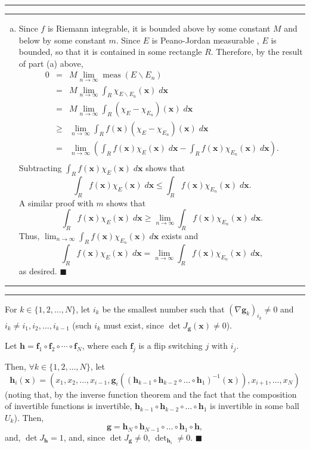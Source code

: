 \documentclass[11pt]{article}
\newcounter{questionCounter}
\newcounter{partCounter}[questionCounter]
\newenvironment{question}[2][\arabic{questionCounter}]{%
    \setcounter{partCounter}{0}%
    \vspace{.25in} \hrule \vspace{0.5em}%
        \noindent{\bf #2}%
    \vspace{0.8em} \hrule \vspace{.10in}%
    \addtocounter{questionCounter}{1}%
}{}
\renewcommand{\qed}{\quad $\blacksquare$}
\newcommand{\meas}{\operatorname{meas}}
\newcommand{\bx}{\mathbf{x}}
\newcommand{\bff}{\mathbf{f}}
\newcommand{\bfg}{\mathbf{g}}
\newcommand{\bfh}{\mathbf{h}}
\newcommand{\pjm}{Peano-Jordan measurable }
\begin{document}
\begin{question}{Problem 2}
\begin{enumerate}[(a)]
\item
Since $f$ is Riemann integrable, it is bounded above by some constant $M$ and
below by some constant $m$.
Since $E$ is \pjm, $E$ is bounded, so that it is contained
in some rectangle $R$. Therefore, by the result of part (a) above,
\begin{eqnarray*}
0 & =    & M\lim_{n \rightarrow \infty} \meas(E \backslash E_n) \\
  & =    & M\lim_{n \rightarrow \infty} \int_R \chi_{E\backslash E_n}(\bx) \; d\bx \\
  & =    & M\lim_{n \rightarrow \infty} \int_R (\chi_E - \chi_{E_n})(\bx) \; d\bx \\
  & \geq & \lim_{n \rightarrow \infty} \int_R f(\bx)(\chi_E - \chi_{E_n})(\bx) \; d\bx \\
  & =    & \lim_{n \rightarrow \infty} \left(\int_R f(\bx)\chi_E(\bx) \; d\bx
    -                                        \int_R f(\bx)\chi_{E_n}(\bx) \; d\bx\right). \\
\end{eqnarray*}
Subtracting $\int_R f(\bx)\chi_E(\bx) \; d\bx$ shows that
\[\int_R f(\bx)\chi_E(\bx) \; d\bx
 \leq \int_R f(\bx)\chi_{E_n}(\bx) \; d\bx
.\]
A similar proof with $m$ shows that
\[\int_R f(\bx)\chi_E(\bx) \; d\bx
  \geq \lim_{n \rightarrow \infty}  \int_R f(\bx)\chi_{E_n}(\bx) \; d\bx
.\]
Thus, $\lim_{n \rightarrow \infty}  \int_R f(\bx)\chi_{E_n}(\bx) \; d\bx$
exists and
\[\int_R f(\bx)\chi_E(\bx) \; d\bx = 
\lim_{n \rightarrow \infty}  \int_R f(\bx)\chi_{E_n}(\bx) \; d\bx
,\]
as desired. \qed
\end{enumerate}
\end{question}

\begin{question}{Problem 3}
For $k \in \{1,2,\ldots,N\}$, let $i_k$ be the smallest number such that
$(\nabla \bfg_k)_{i_k} \neq 0$ and $i_k \neq i_1,i_2,\ldots,i_{k -1}$ (such
$i_k$ must exist, since $\det J_{\bfg}(\bx) \neq 0$).

Let $\bfh = \bff_1 \circ \bff_2 \circ \cdots \circ \bff_N$, where each
$\bff_j$ is a flip switching $j$ with $i_j$.

Then, $\forall k \in \{1,2,\ldots,N\}$, let
\[\bfh_i(\bx)
 = (x_1,x_2,\ldots,x_{i - 1},
      \bfg_i((\bfh_{k - 1}\circ\bfh_{k - 2}\circ\ldots\circ\bfh_1)^{-1}(\bx)),
          x_{i + 1},\ldots,x_N)\]
(noting that, by the inverse function theorem and the fact that the
composition of invertible functions is invertible,
$\bfh_{k - 1}\circ\bfh_{k - 2}\circ\ldots\circ\bfh_1$ is invertible in some
ball $U_k$).
Then, \[\bfg = \bfh_N \circ \bfh_{N - 1} \circ \ldots \circ \bfh_1 \circ \bfh,\]
and, $\det J_{\bfh} = 1$, and, since $\det J_{\bfg} \neq 0$,
$\det_{\bfh_i} \neq 0$. \qed
\end{question}
\end{document}
